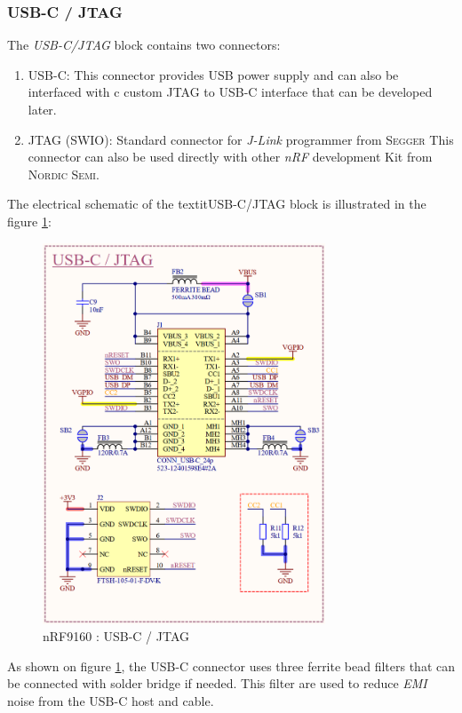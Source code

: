 \documentclass[report.tex]{subfiles}
\begin{document}
\subsubsection{USB-C / JTAG}

The \textit{USB-C/JTAG} block contains two connectors:
\begin{enumerate}
\item USB-C: This connector provides USB power supply and can also be interfaced with c custom JTAG to USB-C interface that can be developed later.
\item JTAG (SWIO): Standard connector for \textit{J-Link} programmer from \textsc{Segger} This connector can also be used directly with other \textit{nRF} development Kit from \textsc{Nordic Semi}.
\end{enumerate}

The electrical schematic of the textit{USB-C/JTAG} block is illustrated in the figure \ref{fig:LTEWatch_nRF9160_USBC_JTAG}:

\begin{figure}[H]
	\centering
	\includegraphics[width=0.75\textwidth]{Include/Figure/Hardware/LTEWatch_nRF9160_USB-C_JTAG}
	\caption{nRF9160 : USB-C / JTAG}
	\label{fig:LTEWatch_nRF9160_USBC_JTAG}
\end{figure}

As shown on figure \ref{fig:LTEWatch_nRF9160_USBC_JTAG}, the USB-C connector uses three ferrite bead filters that can be connected with solder bridge if needed. This filter are used to reduce \textit{EMI} noise from the USB-C host and cable.
\end{document}
